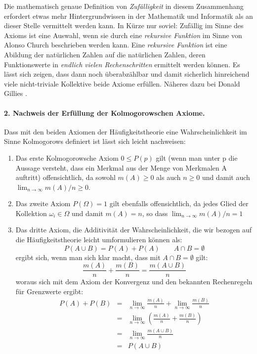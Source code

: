  Die mathematisch genaue Definition von {\em Zufälligkeit} in diesem
 Zusammenhang erfordert etwas mehr Hintergrundwissen in der Mathematik und
 Informatik als an dieser Stelle vermittelt werden kann. In Kürze nur soviel:
 Zufällig im Sinne des Axioms ist eine Auswahl, wenn sie durch eine {\em
 rekursive Funktion} im Sinne von Alonso Church beschrieben werden kann. 
 Eine {\em rekursive Funktion}
 ist eine Abildung der natürlichen Zahlen auf die natürlichen Zahlen, deren
 Funktionswerte in {\em endlich vielen Rechenschritten} ermittelt werden können.
 Es lässt sich zeigen, dass dann noch überabzählbar und damit sicherlich
 hinreichend viele nicht-triviale Kollektive beide Axiome erfüllen. Näheres
 dazu bei Donald Gillies \cite[S. 108]{gillies:2000}.
 
 \paragraph{2. Nachweis der Erfüllung der Kolmogorowschen Axiome.} Dass mit den
 beiden Axiomen der Häufigkeitstheorie eine Wahrscheinlichkeit im Sinne 
 Kolmogorows definiert ist lässt sich leicht nachweisen:
 \begin{enumerate}
   \item Das erste Kolmogorowsche Axiom $0 \leq P(p)$ gilt (wenn man unter p
   die Aussage versteht, dass ein Merkmal aus der Menge von Merkmalen A auftritt) 
   offensichtlich, da sowohl $m(A) \geq 0$ als auch $n \geq 0$ und damit auch
   $\lim_{n\to\infty} m(A)/n \geq 0$. 
   \item Das zweite Axiom $P(\Omega) = 1$ gilt ebenfalls offensichtlich, da
   jedes Glied der Kollektion $\omega_i \in \Omega$ und damit $m(A) = n$, so
   dass $\lim_{n\to\infty} m(A)/n = 1$
   \item Das dritte Axiom, die Additivität der Wahrscheinlichkeit, die wir
   bezogen auf die Häufigkeitstheorie leicht umformulieren können als:
   \[P(A \cup B) = P(A) + P(A) \qquad A \cap B = \emptyset\] ergibt sich, wenn
   man sich klar macht, dass mit $ A \cap B = \emptyset $ gilt:
   \[\frac{m(A)}{n} + \frac{m(B)}{n} = \frac{m(A \cup B)}{n}\]
   woraus sich mit
   dem Axiom der Konvergenz und den bekannten Rechenregeln für Grenzwerte
   ergibt:
   \begin{eqnarray*} 
   P(A) + P(B) & = & \lim_{n\to\infty} \frac{m(A)}{n} + 
                   \lim_{n\to\infty} \frac{m(B)}{n} \\
   { }         & = & \lim_{n\to\infty} (\frac{m(A)}{n} + \frac{m(B)}{n}) \\ 
   { }         & = & \lim_{n\to\infty} \frac{m(A \cup B)}{n} \\
   { }         & = & P(A \cup B)
   \end{eqnarray*}
 \end{enumerate}
 
